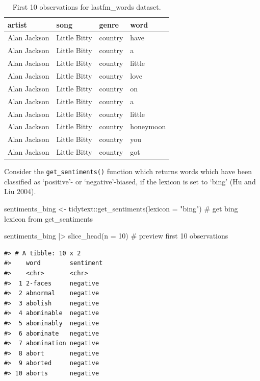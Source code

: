 \documentclass[
  letterpaper,
]{latex/krantz}
\newenvironment{Shaded}{\begin{snugshade}}{\end{snugshade}}
\newcommand{\AttributeTok}[1]{\textcolor[rgb]{0.40,0.45,0.13}{#1}}
\newcommand{\CommentTok}[1]{\textcolor[rgb]{0.37,0.37,0.37}{#1}}
\newcommand{\DecValTok}[1]{\textcolor[rgb]{0.68,0.00,0.00}{#1}}
\newcommand{\FunctionTok}[1]{\textcolor[rgb]{0.28,0.35,0.67}{#1}}
\newcommand{\NormalTok}[1]{\textcolor[rgb]{0.00,0.23,0.31}{#1}}
\newcommand{\OtherTok}[1]{\textcolor[rgb]{0.00,0.23,0.31}{#1}}
\newcommand{\SpecialCharTok}[1]{\textcolor[rgb]{0.37,0.37,0.37}{#1}}
\newcommand{\StringTok}[1]{\textcolor[rgb]{0.13,0.47,0.30}{#1}}
\begin{document}
\hypertarget{tbl-td-lastfm-tokens}{}
\begin{table}
\caption{\label{tbl-td-lastfm-tokens}First 10 observations for lastfm\_words dataset. }\tabularnewline

\centering
\begin{tabular}{llll}
\toprule
artist & song & genre & word\\
\midrule
Alan Jackson & Little Bitty & country & have\\
Alan Jackson & Little Bitty & country & a\\
Alan Jackson & Little Bitty & country & little\\
Alan Jackson & Little Bitty & country & love\\
Alan Jackson & Little Bitty & country & on\\
\addlinespace
Alan Jackson & Little Bitty & country & a\\
Alan Jackson & Little Bitty & country & little\\
Alan Jackson & Little Bitty & country & honeymoon\\
Alan Jackson & Little Bitty & country & you\\
Alan Jackson & Little Bitty & country & got\\
\bottomrule
\end{tabular}
\end{table}

Consider the \texttt{get\_sentiments()} function which returns words
which have been classified as `positive'- or `negative'-biased, if the
lexicon is set to `bing' (Hu and Liu 2004).

\begin{Shaded}
\begin{Highlighting}[]
\NormalTok{sentiments\_bing }\OtherTok{\textless{}{-}} 
\NormalTok{  tidytext}\SpecialCharTok{::}\FunctionTok{get\_sentiments}\NormalTok{(}\AttributeTok{lexicon =} \StringTok{"bing"}\NormalTok{) }\CommentTok{\# get \textquotesingle{}bing\textquotesingle{} lexicon from get\_sentiments}

\NormalTok{sentiments\_bing }\SpecialCharTok{|\textgreater{}} 
  \FunctionTok{slice\_head}\NormalTok{(}\AttributeTok{n =} \DecValTok{10}\NormalTok{) }\CommentTok{\# preview first 10 observations}
\end{Highlighting}
\end{Shaded}

\begin{verbatim}
#> # A tibble: 10 x 2
#>    word        sentiment
#>    <chr>       <chr>    
#>  1 2-faces     negative 
#>  2 abnormal    negative 
#>  3 abolish     negative 
#>  4 abominable  negative 
#>  5 abominably  negative 
#>  6 abominate   negative 
#>  7 abomination negative 
#>  8 abort       negative 
#>  9 aborted     negative 
#> 10 aborts      negative
\end{verbatim}
\end{document}

